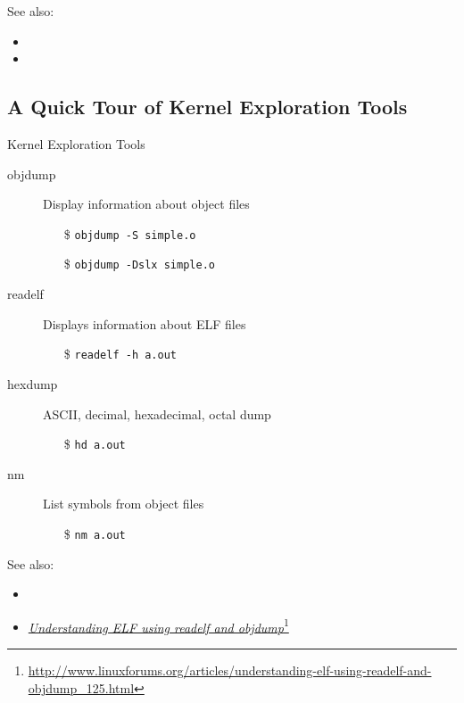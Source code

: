See also:
\begin{itemize}
\item {}
\item {}
\end{itemize}


\subsection{A Quick Tour of Kernel Exploration Tools}

\begin{frame}{Kernel Exploration Tools}
  \begin{description}
  \item[objdump] Display information about object files
    \begin{itemize}
    \item[\$] \texttt{objdump -S simple.o}
    \item[\$] \texttt{objdump -Dslx simple.o}
    \end{itemize}
  \item[readelf] Displays information about ELF files
    \begin{itemize}
    \item[\$] \texttt{readelf -h a.out}
    \end{itemize}
  \item[hexdump] ASCII, decimal, hexadecimal, octal dump
    \begin{itemize}
    \item[\$] \texttt{hd a.out}
    \end{itemize}
  \item[nm] List symbols from object files
    \begin{itemize}
    \item[\$] \texttt{nm a.out}
    \end{itemize}
  \end{description}
\end{frame}

See also:
\begin{itemize}
\item {}
\item \href{http://www.linuxforums.org/articles/understanding-elf-using-readelf-and-objdump\_125.html}{\emph{Understanding ELF using readelf and
    objdump}}\footnote{\url{http://www.linuxforums.org/articles/understanding-elf-using-readelf-and-objdump_125.html}}
\end{itemize}

